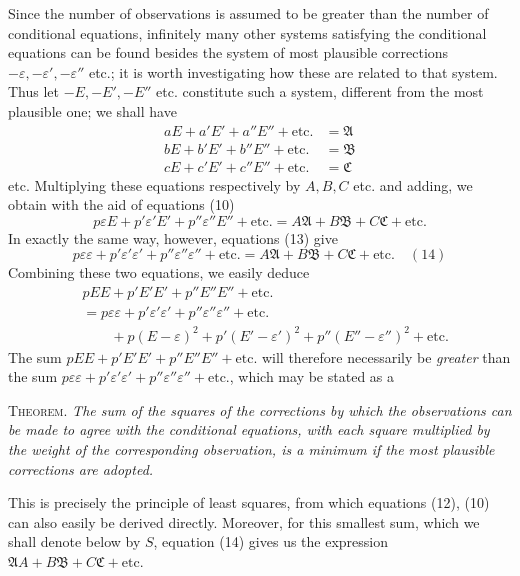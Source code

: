 Since the number of observations is assumed to be greater than the number of conditional equations, infinitely many other systems satisfying the conditional equations can be found besides the system of most plausible corrections \(-\varepsilon,-\varepsilon',-\varepsilon''\) etc.; it is worth investigating how these are related to that system. Thus let \(-E,-E',-E''\) etc. constitute such a system, different from the most plausible one; we shall have
\[
\begin{aligned}
aE+a'E'+a''E''+\text{etc.}&=\mathfrak A\\
bE+b'E'+b''E''+\text{etc.}&=\mathfrak B\\
cE+c'E'+c''E''+\text{etc.}&=\mathfrak C
\end{aligned}
\]
etc. Multiplying these equations respectively by \(A,B,C\) etc. and adding, we obtain with the aid of equations (10)
\[
p\varepsilon E+p'\varepsilon'E'+p''\varepsilon''E''+\text{etc.}=A\mathfrak A+B\mathfrak B+C\mathfrak C+\text{etc.}
\]
In exactly the same way, however, equations (13) give
\[
p\varepsilon\varepsilon+p'\varepsilon'\varepsilon'+p''\varepsilon''\varepsilon''+\text{etc.}=A\mathfrak A+B\mathfrak B+C\mathfrak C+\text{etc.}\quad(14)
\]
Combining these two equations, we easily deduce
\[
\begin{aligned}
&pEE+p'E'E'+p''E''E''+\text{etc.}\\
&=p\varepsilon\varepsilon+p'\varepsilon'\varepsilon'+p''\varepsilon''\varepsilon''+\text{etc.}
\\&\qquad+p(E-\varepsilon)^2+p'(E'-\varepsilon')^2+p''(E''-\varepsilon'')^2+\text{etc.}
\end{aligned}
\]
The sum \(pEE+p'E'E'+p''E''E''+\text{etc.}\) will therefore necessarily be \textit{greater} than the sum \(p\varepsilon\varepsilon+p'\varepsilon'\varepsilon'+p''\varepsilon''\varepsilon''+\text{etc.}\), which may be stated as a

\textsc{Theorem.} \textit{The sum of the squares of the corrections by which the observations can be made to agree with the conditional equations, with each square multiplied by the weight of the corresponding observation, is a minimum if the most plausible corrections are adopted.}

This is precisely the principle of least squares, from which equations (12), (10) can also easily be derived directly. Moreover, for this smallest sum, which we shall denote below by \(S\), equation (14) gives us the expression \(\mathfrak A A+B\mathfrak B+C\mathfrak C+\text{etc.}\)

\clearpage

